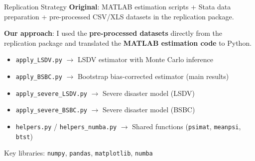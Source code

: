 \documentclass[10pt, aspectratio=169]{beamer}
\begin{document}
\begin{frame}{Replication Strategy}
\textbf{Original}: MATLAB estimation scripts + Stata data preparation + pre-processed CSV/XLS datasets in the replication package.

\vspace{0.3em}
\textbf{Our approach}: I used the \textbf{pre-processed datasets} directly from the replication package and translated the \textbf{MATLAB estimation code} to Python.
\begin{itemize}
    \item \texttt{apply\_LSDV.py} $\rightarrow$ LSDV estimator with Monte Carlo inference
    \item \texttt{apply\_BSBC.py} $\rightarrow$ Bootstrap bias-corrected estimator (main results)
    \item \texttt{apply\_severe\_LSDV.py} $\rightarrow$ Severe disaster model (LSDV)
    \item \texttt{apply\_severe\_BSBC.py} $\rightarrow$ Severe disaster model (BSBC)
    \item \texttt{helpers.py} / \texttt{helpers\_numba.py} $\rightarrow$ Shared functions (\texttt{psimat}, \texttt{meanpsi}, \texttt{btst})
\end{itemize}
\vspace{0.3em}
Key libraries: \texttt{numpy}, \texttt{pandas}, \texttt{matplotlib}, \texttt{numba}
\end{frame}
\end{document}
